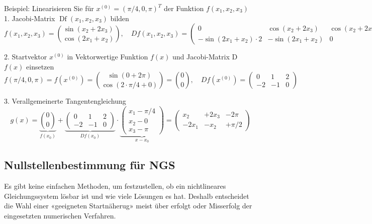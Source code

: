 \begin{example}
    Beispiel: Linearisieren Sie für $x^{(0)}=(\pi / 4,0, \pi)^T$ der Funktion $f\left(x_1, x_2, x_3\right)$
    \vspace{2mm} \\
    1. Jacobi-Matrix $\operatorname{Df}\left(x_1, x_2, x_3\right)$ bilden
    $$
    f\left(x_1, x_2, x_3\right)=\binom{\sin \left(x_2+2 x_3\right)}{\cos \left(2 x_1+x_2\right)}, \quad D f\left(x_1, x_2, x_3\right)=\left(\begin{array}{ccc}
    0 & \cos \left(x_2+2 x_3\right) & \cos \left(x_2+2 x_3\right) \cdot 2 \\
    -\sin \left(2 x_1+x_2\right) \cdot 2 & -\sin \left(2 x_1+x_2\right) & 0
    \end{array}\right)
    $$

    2. Startvektor $x^{(0)}$ in Vektorwertige Funktion $f(x)$ und Jacobi-Matrix D $f(x)$ einsetzen
    $$
    f(\pi / 4,0, \pi)=f\left(x^{(0)}\right)=\binom{\sin (0+2 \pi)}{\cos (2 \cdot \pi / 4+0)}=\binom{0}{0}, \quad D f\left(x^{(0)}\right)=\left(\begin{array}{ccc}
    0 & 1 & 2 \\
    -2 & -1 & 0
    \end{array}\right)
    $$

    3. Verallgemeinerte Tangentengleichung
    $$
    g(x)=\underbrace{\binom{0}{0}}_{f\left(x_0\right)}+\underbrace{\left(\begin{array}{ccc}
    0 & 1 & 2 \\
    -2 & -1 & 0
    \end{array}\right)}_{D f\left(x_0\right)} \cdot \underbrace{\left(\begin{array}{c}
    x_1-\pi / 4 \\
    x_2-0 \\
    x_3-\pi
    \end{array}\right)}_{x-x_0}=\left(\begin{array}{ccc}
    x_2 & +2 x_3 & -2 \pi \\
    -2 x_1 & -x_2 & +\pi / 2
    \end{array}\right)
    $$
\end{example}

\subsection{Nullstellenbestimmung für NGS}

\begin{remark}
    Es gibt keine einfachen Methoden, um festzustellen, ob ein nichtlineares Gleichungssystem lösbar ist und wie viele Lösungen es hat. Deshalb entscheidet die Wahl
    einer «geeigneten Startnäherug» meist über erfolgt oder Misserfolg der eingesetzten numerischen Verfahren.
\end{remark}

